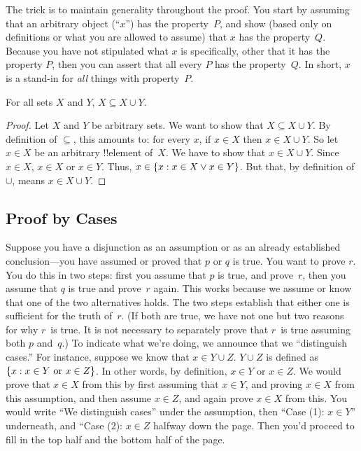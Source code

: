 \documentclass[../../../include/open-logic-section]{subfiles}
\begin{document}
The trick is to maintain generality throughout the proof. You start by
assuming that an arbitrary object (``$x$'') has the property~$P$, and
show (based only on definitions or what you are allowed to assume)
that $x$ has the property~$Q$. Because you have not stipulated what
$x$ is specifically, other that it has the property $P$, then you can
assert that all every $P$ has the property~$Q$. In short, $x$ is a
stand-in for \emph{all} things with property~$P$.

\begin{prop}
  For all sets $X$ and $Y$, $X \subseteq X \cup Y$.
\end{prop}

\begin{proof}
  Let $X$ and $Y$ be arbitrary sets.  We want to show that $X
  \subseteq X \cup Y$. By definition of $\subseteq$, this amounts to:
  for every $x$, if $x \in X$ then $x \in X \cup Y$. So let $x \in X$
  be an arbitrary !!{element} of~$X$. We have to show that $x \in X
  \cup Y$. Since $x \in X$, $x \in X$ or $x \in Y$. Thus, $x \in
  \{ x : x \in X \lor x \in Y \}$. But that, by definition of $\cup
  $, means $x \in X \cup Y$.
\end{proof}


\subsection{Proof by Cases}

Suppose you have a disjunction as an assumption or as an already
established conclusion---you have assumed or proved that $p$ or $q$ is
true.  You want to prove $r$.  You do this in two steps: first you
assume that $p$ is true, and prove~$r$, then you assume that $q$ is
true and prove~$r$ again.  This works because we assume or know that
one of the two alternatives holds. The two steps establish that either
one is sufficient for the truth of~$r$.  (If both are true, we have
not one but two reasons for why $r$~is true. It is not necessary to
separately prove that $r$~is true assuming both $p$ and~$q$.)  To
indicate what we're doing, we announce that we ``distinguish cases.''
For instance, suppose we know that $x \in Y \cup Z$.  $Y \cup Z$ is
defined as $\{ x : x \in Y \text{ or } x \in Z \}$. In other words,
by definition, $x \in Y$ or $x \in Z$. We would prove that $x \in X$
from this by first assuming that $x \in Y$, and proving $x \in X$ from
this assumption, and then assume $x \in Z$, and again prove $x \in X$
from this.  You would write ``We distinguish cases'' under the
assumption, then ``Case (1): $x \in Y$'' underneath, and ``Case (2):
$x \in Z$ halfway down the page. Then you'd proceed to fill in the top
half and the bottom half of the page.
\end{document}
